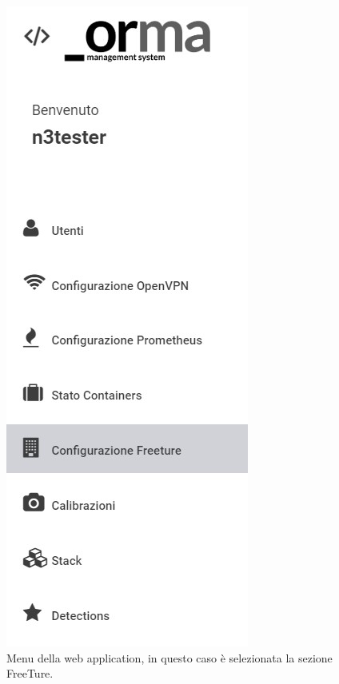 \begin{figure}
    \begin{center}
    \includegraphics[scale=0.8]{images/menu.jpg}
    \caption{Menu della web application, in questo caso è selezionata la sezione FreeTure.}
    \label{fig:menu}
    \end{center}
\end{figure}